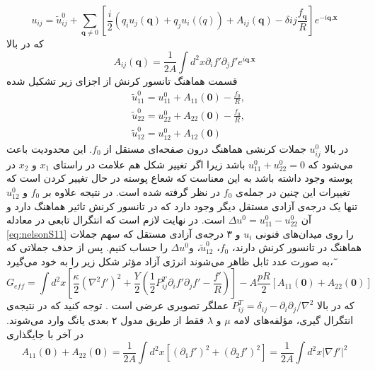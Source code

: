  \begin{equation}
u_{ij}=\tilde u_{ij}^0+\sum_{\boldsymbol q \neq 0}\left[\frac{i}{2}\left(q_iu_j(\boldsymbol q)+q_ju_i(\boldsymbol(q)\right)+A_{ij}(\boldsymbol q)-\delta{ij}\frac{f_{\boldsymbol q}}{R}\right]e^{-i\boldsymbol q.\boldsymbol x}
\label{eq:nelsonS12}
\end{equation}
که در بالا 
 \begin{equation}
A_{ij}(\boldsymbol q)=\frac{1}{2A}\int d^2x\partial_if'\partial_jf'e^{i\boldsymbol q.\boldsymbol x}
\label{eq:nelsonS13}
\end{equation}
قسمت هماهنگ تانسور کرنش از اجزای زیر تشکیل شده
\begin{equation}
\begin{aligned}
&\tilde u_{11}^0=u_{11}^0+A_{11}(\boldsymbol 0)-\frac{f_0}{R}, \\
&\tilde u_{22}^0=u_{22}^0+A_{22}(\boldsymbol 0)-\frac{f_0}{R}, \\
&\tilde u_{12}^0=u_{12}^0+A_{12}(\boldsymbol 0)
\label{eq:nelsonS14}
\end{aligned}
\end{equation}
در بالا $u_{ij}^0$ جملات کرنشی هماهنگ درون صفحه‌ای مستقل از $f_0$. این محدودیت باعث می‌شود که $u_{11}^0+u_{22}^0=0$ باشد زیرا اگر تغییر شکل هم علامت در راستای $x_1$ و $x_2$ در پوسته وجود داشته باشد به این معناست که شعاع پوسته در حال تغییر کردن است که تغییرات این چنین در  جمله‌ی $f_0$ در نظر گرفته شده است. در نتیجه علاوه بر $f_0$
و $u_{12}^0$
تنها یک درجه‌ی آزادی مستقل دیگر وجود دارد که در تانسور کرنش تاثیر هماهنگ دارد و آن $\Delta u^0 = u_{11}^0-u_{22}^0$ است.
در نهایت لازم است که انتگرال تابعی در معادله \ref{eq:nelsonS11} را روی میدان‌های فنونی $u_i$ 
و ۳ درجه‌ی آزادی مستقل که سهم جملات هماهنگ در تانسور کرنش دارند، 
$f_0$، $\tilde u_{12}^0$، و$\Delta u^0$
را حساب کنیم. پس از حذف جملاتی که به صورت عدد ثابل ظاهر می‌شوند انرژی آزاد مؤثر شکل زیر را به خود می‌‌گیرد،
ٓ\begin{equation}
G_{eff}=\int d^2x\left[\frac{\kappa}{2}(\nabla^2f')^2+\frac{Y}{2}\left(\frac{1}{2}P_{ij}^T\partial_if'\partial_jf'-\frac{f'}{R}\right)\right]-A\frac{pR}{2}[A_{11}(\boldsymbol 0)+A_{22}(\boldsymbol 0)]
\label{eq:nelsonS15}
\end{equation}
که در بالا $P_{ij}^T=\delta_{ij}-\partial_i\partial_j/\nabla^2$ عملگر تصویری عرضی‌ است
. توجه کنید که در نتیجه‌ی انتگرال گیری، مؤلفه‌های لامه $\mu$ و $\lambda$ فقط از طریق مدول ۲ بعدی یانگ وارد می‌شوند. در آخر با جایگذاری
\begin{equation}
A_{11}(\boldsymbol 0)+A_{22}(\boldsymbol 0)=\frac{1}{2A}\int d^2x\left[ (\partial_1f')^2+(\partial_2f')^2\right] = \frac{1}{2A}\int d^2x| \nabla f'|^2
\label{eq:nelsonS16}
\end{equation}
